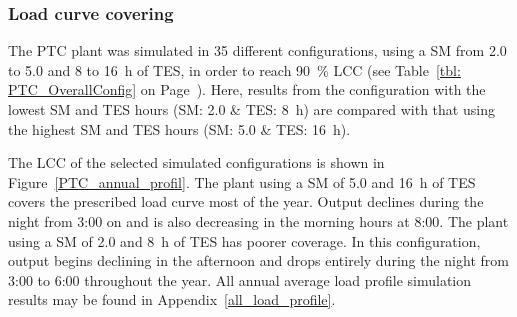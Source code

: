 \subsubsection{Load curve covering}
The \ac{PTC} plant was simulated in 35 different configurations, using a \ac{SM} from \num{2.0} to \num{5.0} and \num{8} to \SI{16}{h} of \ac{TES}, in order to reach \SI{90}{\percent} \ac{LCC} (see Table~\ref{tbl: PTC_OverallConfig} on Page~\pageref{tbl: PTC_OverallConfig}). Here, results from the configuration with the lowest \ac{SM} and \ac{TES} hours (\ac{SM}: \num{2.0} \& \ac{TES}: \SI{8}{h}) are compared with that using the highest \ac{SM} and \ac{TES} hours  (\ac{SM}: \num{5.0} \& \ac{TES}: \SI{16}{h}).  


The \ac{LCC} of the selected simulated configurations is shown in Figure~\ref{PTC_annual_profil}. The plant using a \ac{SM} of \num{5.0} and \SI{16}{h} of \ac{TES} covers the prescribed load curve most of the year. Output declines during the night from 3:00 on and is also decreasing in the morning hours at 8:00. The plant using a \ac{SM} of \num{2.0} and \SI{8}{h} of \ac{TES} has poorer coverage. In this configuration, output begins declining in the afternoon and drops entirely during the night from 3:00 to 6:00 throughout the year. All annual average load profile simulation results may be found in Appendix~\ref{all_load_profile}.

